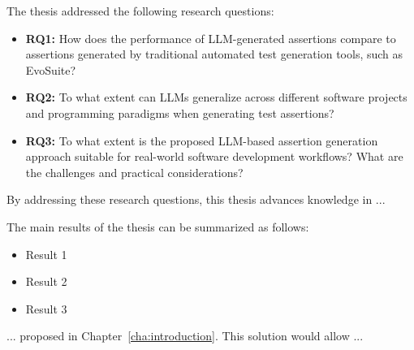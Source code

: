 The thesis addressed the following research questions:

\begin{itemize}
    \item \textbf{RQ1:} How does the performance of LLM-generated assertions compare to assertions generated by traditional automated test generation tools, such as EvoSuite?

    \item \textbf{RQ2:} To what extent can LLMs generalize across different software projects and programming paradigms when generating test assertions?
    
    \item \textbf{RQ3:} To what extent is the proposed LLM-based assertion generation approach suitable for real-world software development workflows? What are the challenges and practical considerations?
\end{itemize}

By addressing these research questions, this thesis advances knowledge in ...

The main results of the thesis can be summarized as follows:
\begin{itemize}
  \item Result 1
  \item Result 2
  \item Result 3
\end{itemize}

... proposed in Chapter~\ref{cha:introduction}. This solution would allow ...